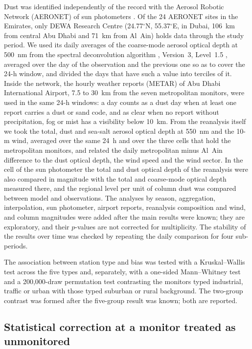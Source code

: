 Dust was identified independently of the \pmten{} record with the Aerosol Robotic Network
(AERONET) of sun photometers \citep{holben1998}. Of the 24 AERONET sites in the Emirates, only DEWA
Research Centre (24.77$^{\circ}$N, 55.37$^{\circ}$E, in Dubai, 106~km from central Abu Dhabi and
71~km from Al~Ain) holds data through the study period. We used its daily averages of the
coarse-mode aerosol optical depth at 500~nm from the spectral deconvolution algorithm
\citep{oneill2003}, Version~3, Level~1.5 \citep{giles2019}, averaged over the day of the
observation and the previous one so as to cover the 24-h window, and divided the days that have
such a value into terciles of it. Inside the network, the hourly weather reports (METAR) of Abu
Dhabi International Airport, 7.5 to 30~km from the seven metropolitan monitors, were used in the same
24-h windows: a day counts as a dust day when at least one report carries a dust or sand code, and
as clear when no report without precipitation, fog or mist has a visibility below 10~km. From the reanalysis itself we took the total, dust and
sea-salt aerosol optical depth at 550~nm and the 10-m wind, averaged over the same 24~h and over
the three cells that hold the metropolitan monitors, and related the daily metropolitan minus
Al~Ain difference to the dust optical depth, the wind speed and the wind sector. In the cell of the sun
photometer the total and dust optical depth of the reanalysis were also compared in magnitude with
the total and coarse-mode optical depth measured there, and the regional level per unit of column
dust was compared between model and observations. The analyses by
season, aggregation, interpolation, sun photometer, airport reports, reanalysis composition and
wind, and column magnitudes were added after the main results were known; they are exploratory, and their $p$-values are
not corrected for multiplicity. The stability of the results over time was checked by repeating the daily comparison for four sub-periods.

The association between station type and bias was tested with a Kruskal--Wallis test across the
five types \citep{kruskal1952} and, separately, with a one-sided Mann--Whitney test
\citep{mann1947} and a 200,000-draw permutation
test contrasting the monitors typed industrial, traffic or urban with those typed suburban or
rural background. The two-group contrast was formed after the five-group result was known; both
are reported.

\subsection{Statistical correction at a monitor treated as unmonitored}
\label{sec:methods-transfer}

